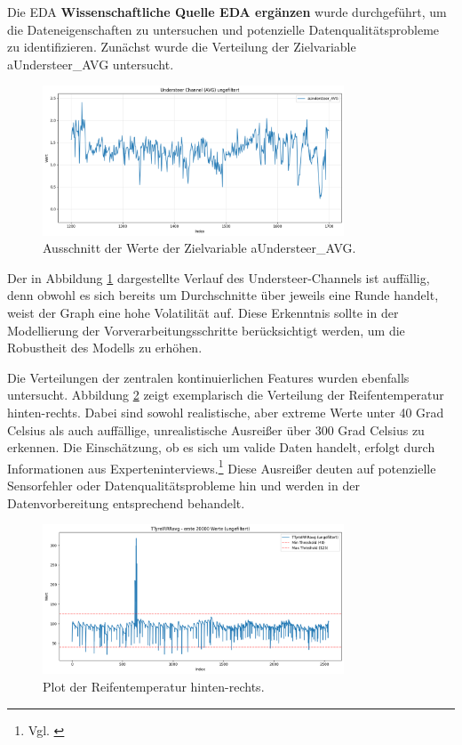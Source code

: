 Die \ac{EDA} \textbf{Wissenschaftliche Quelle EDA ergänzen} wurde durchgeführt, um die Dateneigenschaften zu untersuchen und potenzielle Datenqualitätsprobleme zu identifizieren. Zunächst wurde die Verteilung der Zielvariable aUndersteer\_AVG untersucht. 
\begin{figure}[H]
  \centering
  \includegraphics[width=0.8\textwidth]{graphics/understeer_nonfilt.png}
  \caption{Ausschnitt der Werte der Zielvariable aUndersteer\_AVG.}
  \label{fig:understeer_distribution}
\end{figure}
Der in Abbildung \ref{fig:understeer_distribution} dargestellte Verlauf des Understeer-Channels ist auffällig, denn obwohl es sich bereits um Durchschnitte über jeweils eine Runde handelt, weist der Graph eine hohe Volatilität auf.
Diese Erkenntnis sollte in der Modellierung der Vorverarbeitungsschritte berücksichtigt werden, um die Robustheit des Modells zu erhöhen.

Die Verteilungen der zentralen kontinuierlichen Features wurden ebenfalls untersucht. Abbildung \ref{fig:temp_distribution} zeigt exemplarisch die Verteilung der Reifentemperatur hinten-rechts. Dabei sind sowohl realistische, aber extreme Werte unter 40 Grad Celsius als auch auffällige, unrealistische Ausreißer über 300 Grad Celsius zu erkennen. Die Einschätzung, ob es sich um valide Daten handelt, erfolgt durch Informationen aus Experteninterviews.\footnote{Vgl. \cite{Experteninterview1}} Diese Ausreißer deuten auf potenzielle Sensorfehler oder Datenqualitätsprobleme hin und werden in der Datenvorbereitung entsprechend behandelt.
\begin{figure}[H]
  \centering
  \includegraphics[width=0.8\textwidth]{graphics/TempPlot.png}
  \caption{Plot der Reifentemperatur hinten-rechts.}
  \label{fig:temp_distribution}
\end{figure}

